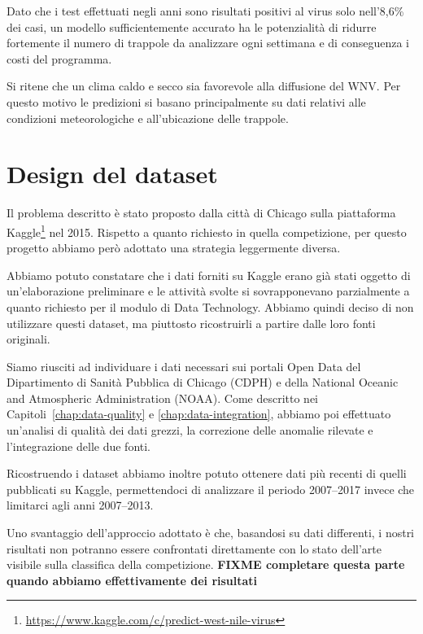 Dato che i test effettuati negli anni sono risultati positivi al virus solo 
nell'8,6\% dei casi, un modello sufficientemente accurato ha le potenzialità di 
ridurre fortemente il numero di trappole da analizzare ogni settimana e di 
conseguenza i costi del programma. 


Si ritene che un clima caldo e secco sia favorevole alla diffusione del WNV. 
Per questo motivo le predizioni si basano principalmente su dati relativi alle 
condizioni meteorologiche e all'ubicazione delle trappole.

\section{Design del dataset}

Il problema descritto è stato proposto dalla città di Chicago sulla piattaforma 
Kaggle\footnote{\url{https://www.kaggle.com/c/predict-west-nile-virus}} nel 
2015. Rispetto a quanto richiesto in quella competizione, per questo progetto 
abbiamo però adottato una strategia leggermente diversa.

Abbiamo potuto constatare che i dati forniti su Kaggle erano già stati oggetto 
di un'elaborazione preliminare e le attività svolte si sovrapponevano 
parzialmente a quanto richiesto per il modulo di Data Technology. Abbiamo 
quindi deciso di non utilizzare questi dataset, ma piuttosto ricostruirli a 
partire dalle loro fonti originali.

Siamo riusciti ad individuare i dati necessari sui portali Open Data del 
Dipartimento di Sanità Pubblica di Chicago (CDPH) e della National Oceanic and 
Atmospheric Administration (NOAA). Come descritto nei 
Capitoli~\ref{chap:data-quality} e \ref{chap:data-integration}, abbiamo poi 
effettuato un'analisi di qualità dei dati grezzi, la correzione delle anomalie 
rilevate e l'integrazione delle due fonti.

Ricostruendo i dataset abbiamo inoltre potuto ottenere dati più recenti di 
quelli pubblicati su Kaggle, permettendoci di analizzare il periodo 2007--2017 
invece che limitarci agli anni 2007--2013.

Uno svantaggio dell'approccio adottato è che, basandosi su dati differenti, i 
nostri risultati non potranno essere confrontati direttamente con lo stato 
dell'arte visibile sulla classifica della competizione. \textbf{FIXME 
completare questa parte quando abbiamo effettivamente dei risultati}
